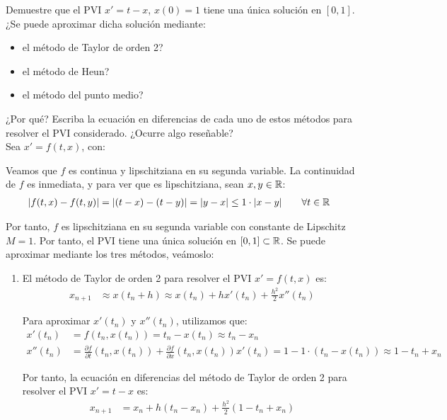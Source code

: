 \begin{ejercicio}\label{ej:3.1.7}
    Demuestre que el PVI $x' = t - x$, $x(0) = 1$ tiene una única solución en $[0, 1]$. ¿Se puede aproximar dicha solución mediante:
    \begin{itemize}
        \item el método de Taylor de orden 2?
        \item el método de Heun?
        \item el método del punto medio?
    \end{itemize}
    ¿Por qué? Escriba la ecuación en diferencias de cada uno de estos métodos para resolver el PVI considerado. ¿Ocurre algo reseñable?\\

    Sea $x'=f(t, x)$, con:

    Veamos que $f$ es continua y lipschitziana en su segunda variable. La continuidad de $f$ es inmediata, y para ver que es lipschitziana, sean $x,y\in \mathbb{R}$:
    \begin{align*}
        |f(t, x) - f(t, y)| &= |(t - x) - (t - y)| = |y - x|\leq 1\cdot |x-y|\qquad \forall t\in \mathbb{R}
    \end{align*}

    Por tanto, $f$ es lipschitziana en su segunda variable con constante de Lipschitz $M = 1$. Por tanto, el PVI tiene una única solución en $[0,1]\subset \mathbb{R}$. Se puede aproximar mediante los tres métodos, veámoslo:
    \begin{enumerate}
        \item El método de Taylor de orden 2 para resolver el PVI $x' = f(t, x)$ es:
        \begin{align*}
            x_{n+1} &\approx x(t_n + h) \approx x(t_n) + hx'(t_n) + \frac{h^2}{2} x''(t_n)
        \end{align*}

        Para aproximar $x'(t_n)$ y $x''(t_n)$, utilizamos que:
        \begin{align*}
            x'(t_n) &= f(t_n, x(t_n)) = t_n - x(t_n)\approx t_n - x_n \\
            x''(t_n) &= \frac{\partial f}{\partial t}(t_n, x(t_n)) + \frac{\partial f}{\partial x}(t_n, x(t_n)) x'(t_n) = 1 - 1\cdot (t_n - x(t_n)) \approx 1 - t_n + x_n
        \end{align*}

        Por tanto, la ecuación en diferencias del método de Taylor de orden 2 para resolver el PVI $x' = t - x$ es:
        \begin{align*}
            x_{n+1} &= x_n + h(t_n - x_n) + \frac{h^2}{2} (1 - t_n + x_n)
        \end{align*}


\end{enumerate}
\end{ejercicio}
